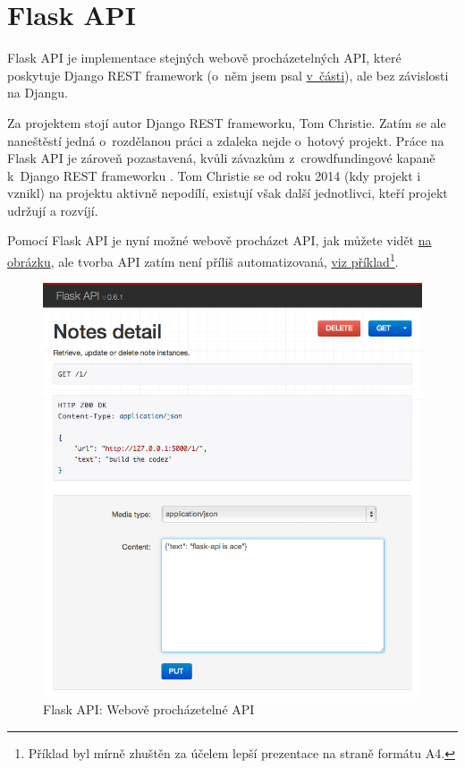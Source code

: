 \section{Flask API}\label{flask-api}

Flask API je implementace stejných webově procházetelných API, které poskytuje Django REST framework \autocite{flaskapi} (o~něm jsem psal \protect\hyperlink{drf:fra}{v~části}), ale bez závislosti na Djangu.

Za projektem stojí autor Django REST frameworku, Tom Christie. Zatím se ale naneštěstí jedná o~rozdělanou práci \autocite{flaskapi} a zdaleka nejde o~hotový projekt. Práce na Flask API je zároveň pozastavená, kvůli závazkům z~crowdfundingové kapaně k~Django REST frameworku \autocite{flaskapigh}. Tom Christie se od roku 2014 (kdy projekt i vznikl) na projektu aktivně nepodílí, existují však další jednotlivci, kteří projekt udržují a rozvíjí.

Pomocí Flask API je nyní možné webově procházet API, jak můžete vidět \protect\hyperlink{pic:flaskapibrowsable}{na obrázku}, ale tvorba API zatím není příliš automatizovaná, \protect\hyperlink{code:flaskapi}{viz příklad}\footnote{Příklad byl mírně zhuštěn za účelem lepší prezentace na straně formátu A4.}.

\begin{figure}
\centering
\includegraphics{images/flask-api-browsable}
\caption{Flask API: Webově procházetelné API \autocite{flaskapi}\label{pic:flaskapibrowsable}}
\end{figure}

